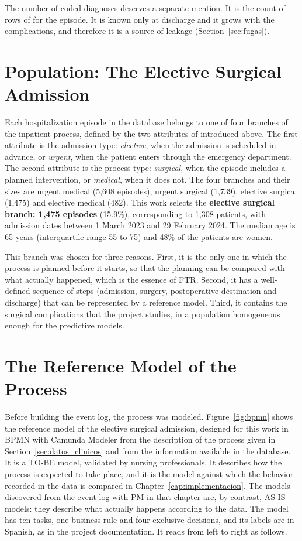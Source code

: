 The number of coded diagnoses deserves a separate mention. It is the count of rows of  for the episode. It is known only at discharge and it grows with the complications, and therefore it is a source of leakage (Section~\ref{sec:fugas}).

\section{Population: The Elective Surgical Admission}
\label{sec:poblacion}

Each hospitalization episode in the database belongs to one of four branches of the inpatient process, defined by the two attributes of  introduced above. The first attribute is the admission type: \emph{elective}, when the admission is scheduled in advance, or \emph{urgent}, when the patient enters through the emergency department. The second attribute is the process type: \emph{surgical}, when the episode includes a planned intervention, or \emph{medical}, when it does not. The four branches and their sizes are urgent medical (5,608 episodes), urgent surgical (1,739), elective surgical (1,475) and elective medical (482). This work selects the \textbf{elective surgical branch: 1,475 episodes} (15.9\%), corresponding to 1,308 patients, with admission dates between 1 March 2023 and 29 February 2024. The median age is 65 years (interquartile range 55 to 75) and 48\% of the patients are women.

This branch was chosen for three reasons. First, it is the only one in which the process is planned before it starts, so that the planning can be compared with what actually happened, which is the essence of FTR. Second, it has a well-defined sequence of steps (admission, surgery, postoperative destination and discharge) that can be represented by a reference model. Third, it contains the surgical complications that the project studies, in a population homogeneous enough for the predictive models.

\section{The Reference Model of the Process}
\label{sec:modelo}

Before building the event log, the process was modeled. Figure~\ref{fig:bpmn} shows the reference model of the elective surgical admission, designed for this work in BPMN with Camunda Modeler from the description of the process given in Section~\ref{sec:datos_clinicos} and from the information available in the database. It is a TO-BE model, validated by nursing professionals. It describes how the process is expected to take place, and it is the model against which the behavior recorded in the data is compared in Chapter~\ref{cap:implementacion}. The models discovered from the event log with PM in that chapter are, by contrast, AS-IS models: they describe what actually happens according to the data. The model has ten tasks, one business rule and four exclusive decisions, and its labels are in Spanish, as in the project documentation. It reads from left to right as follows.

